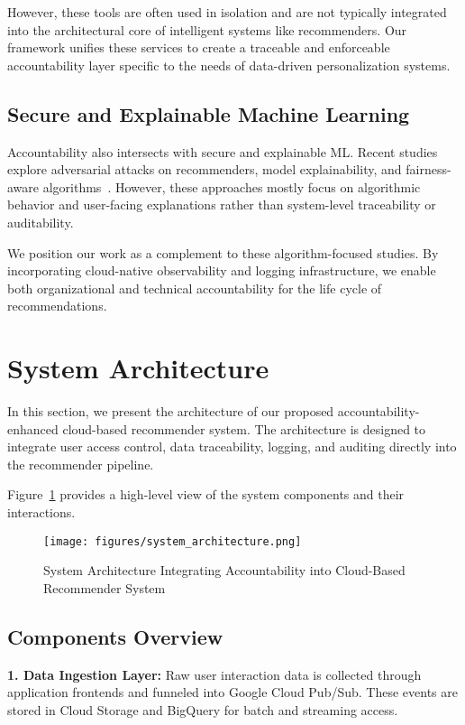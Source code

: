 \documentclass[acmsmall]{acmart}
\begin{document}
However, these tools are often used in isolation and are not typically integrated into the architectural core of intelligent systems like recommenders. Our framework unifies these services to create a traceable and enforceable accountability layer specific to the needs of data-driven personalization systems.

\subsection{Secure and Explainable Machine Learning}

Accountability also intersects with secure and explainable ML. Recent studies explore adversarial attacks on recommenders, model explainability, and fairness-aware algorithms~\cite{zhang2020explainable, burkart2021survey}. However, these approaches mostly focus on algorithmic behavior and user-facing explanations rather than system-level traceability or auditability.

We position our work as a complement to these algorithm-focused studies. By incorporating cloud-native observability and logging infrastructure, we enable both organizational and technical accountability for the life cycle of recommendations.

\section{System Architecture}

In this section, we present the architecture of our proposed accountability-enhanced cloud-based recommender system. The architecture is designed to integrate user access control, data traceability, logging, and auditing directly into the recommender pipeline.

Figure~\ref{fig:system_architecture} provides a high-level view of the system components and their interactions.

\begin{figure}[h]
    \centering
    \texttt{[image: figures/system\_architecture.png]}
    \caption{System Architecture Integrating Accountability into Cloud-Based Recommender System}
    \label{fig:system_architecture}
\end{figure}

\subsection{Components Overview}

\textbf{1. Data Ingestion Layer:}  
Raw user interaction data is collected through application frontends and funneled into Google Cloud Pub/Sub. These events are stored in Cloud Storage and BigQuery for batch and streaming access.
\end{document}
